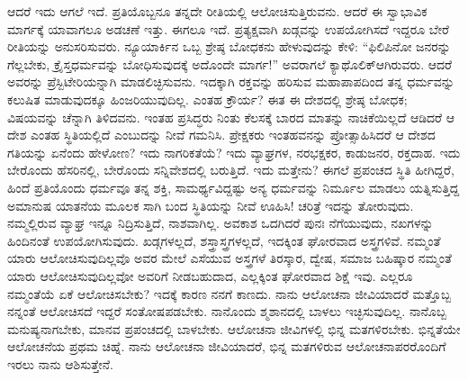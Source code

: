 
ಆದರೆ ಇದು ಆಗಲೆ ಇದೆ. ಪ್ರತಿಯೊಬ್ಬನೂ ತನ್ನದೇ ರೀತಿಯಲ್ಲಿ ಆಲೋಚಿಸುತ್ತಿರು\break ವನು. ಆದರೆ ಈ ಸ್ವಾಭಾವಿಕ ಮಾರ್ಗಕ್ಕೆ ಯಾವಾಗಲೂ ಅಡಚಣೆ ಇತ್ತು. ಈಗಲೂ ಇದೆ. ಪ್ರತ್ಯಕ್ಷವಾಗಿ ಖಡ್ಗವನ್ನು ಉಪಯೋಗಿಸದೆ ಇದ್ದರೂ ಬೇರೆ ರೀತಿಯನ್ನು ಅನುಸರಿಸುವರು. ನ್ಯೂಯಾರ್ಕಿನ ಒಬ್ಬ ಶ್ರೇಷ್ಠ ಬೋಧಕನು ಹೇಳುವುದನ್ನು ಕೇಳಿ: “ಫಿಲಿಪಿನೋ ಜನರನ್ನು ಗೆಲ್ಲಬೇಕು, ಕ್ರೈಸ್ತಧರ್ಮವನ್ನು ಬೋಧಿಸುವುದಕ್ಕೆ ಅದೊಂದೇ ಮಾರ್ಗ!” ಅವರಾಗಲೆ ಕ್ಯಾಥೊಲಿಕ್​ ಆಗಿರುವರು. ಆದರೆ ಅವರನ್ನು ಪ್ರೆಸ್ಬಿಟೇರಿಯನ್ನಾಗಿ ಮಾಡಲಿಚ್ಛಿಸುವನು. ಇದಕ್ಕಾಗಿ ರಕ್ತವನ್ನು ಹರಿಸುವ ಮಹಾಪಾಪದಿಂದ ತನ್ನ ಧರ್ಮವನ್ನು ಕಲುಷಿತ ಮಾಡುವುದಕ್ಕೂ ಹಿಂಜರಿಯುವುದಿಲ್ಲ. ಎಂತಹ ಕ್ರೌರ್ಯ? ಈತ ಈ ದೇಶದಲ್ಲಿ ಶ್ರೇಷ್ಠ ಬೋಧಕ; ವಿಷಯವನ್ನು ಚೆನ್ನಾಗಿ ತಿಳಿದವನು. ಇಂತಹ ಪ್ರಸಿದ್ಧರು ನಿಂತು ಕೆಲಸಕ್ಕೆ ಬಾರದ ಮಾತನ್ನು ನಾಚಿಕೆಯಿಲ್ಲದೆ ಆಡಿದರೆ ಆ ದೇಶ ಎಂತಹ ಸ್ಥಿತಿಯಲ್ಲಿದೆ ಎಂಬುದನ್ನು ನೀವೆ ಗಮನಿಸಿ. ಪ್ರೇಕ್ಷಕರು ಇಂತಹವನನ್ನು ಪ್ರೋತ್ಸಾಹಿಸಿದರೆ ಆ ದೇಶದ ಗತಿಯನ್ನು ಏನೆಂದು ಹೇಳೋಣ? ಇದು ನಾಗರಿಕತೆಯೆ? ಇದು ವ್ಯಾಘ್ರಗಳ, ನರಭಕ್ಷಕರ, ಕಾಡುಜನರ, ರಕ್ತದಾಹ. ಇದು ಬೇರೊಂದು ಹೆಸರಿನಲ್ಲಿ, ಬೇರೊಂದು ಸನ್ನಿವೇಶದಲ್ಲಿ ಬರುತ್ತಿದೆ. ಇದು ಮತ್ತೇನು? ಈಗಲೆ ಪ್ರಪಂಚದ ಸ್ಥಿತಿ ಹೀಗಿದ್ದರೆ, ಹಿಂದೆ ಪ್ರತಿಯೊಂದು ಧರ್ಮವೂ ತನ್ನ ಶಕ್ತಿ, ಸಾಮರ್ಥ್ಯವಿದ್ದಷ್ಟು ಅನ್ಯ ಧರ್ಮವನ್ನು ನಿರ್ಮೂಲ ಮಾಡಲು ಯತ್ನಿಸುತ್ತಿದ್ದ ಅಮಾನುಷ ಯಾತನೆಯ ಮೂಲಕ ಸಾಗಿ ಬಂದ ಸ್ಥಿತಿಯನ್ನು ನೀವೆ ಊಹಿಸಿ! ಚರಿತ್ರೆ ಇದನ್ನು ತೋರುವುದು. ನಮ್ಮಲ್ಲಿರುವ ವ್ಯಾಘ್ರ ಇನ್ನೂ ನಿದ್ರಿಸುತ್ತಿದೆ, ನಾಶವಾಗಿಲ್ಲ. ಅವಕಾಶ ಒದಗಿದರೆ ಪುನಃ ನೆಗೆಯುವುದು, ನಖಗಳನ್ನು ಹಿಂದಿನಂತೆ ಉಪಯೋಗಿಸುವುದು. ಖಡ್ಗಗಳಲ್ಲದೆ, ಶಸ್ತ್ರಾಸ್ತ್ರಗಳಲ್ಲದೆ, ಇದಕ್ಕಿಂತ ಘೋರವಾದ ಅಸ್ತ್ರಗಳಿವೆ. ನಮ್ಮಂತೆ ಯಾರು ಆಲೋಚಿಸುವುದಿಲ್ಲವೊ ಅವರ ಮೇಲೆ ಎಸೆಯುವ ಅಸ್ತ್ರಗಳೆ ತಿರಸ್ಕಾರ, ದ್ವೇಷ, ಸಮಾಜ ಬಹಿಷ್ಕಾರ ನಮ್ಮಂತೆ ಯಾರು ಆಲೋಚಿಸುವುದಿಲ್ಲವೋ ಅವರಿಗೆ ನೀಡಬಹುದಾದ, ಎಲ್ಲಕ್ಕಿಂತ ಘೋರವಾದ ಶಿಕ್ಷೆ ಇವು. ಎಲ್ಲರೂ ನಮ್ಮಂತೆಯೆ ಏಕೆ ಆಲೋಚಿಸಬೇಕು? ಇದಕ್ಕೆ ಕಾರಣ ನನಗೆ ಕಾಣದು. ನಾನು ಆಲೋಚನಾ ಜೀವಿಯಾದರೆ ಮತ್ತೊಬ್ಬ ನನ್ನಂತೆ ಆಲೋಚಿಸದೆ ಇದ್ದರೆ ಸಂತೋಷಪಡಬೇಕು. ನಾನೊಂದು ಶ್ಮಶಾನದಲ್ಲಿ ಬಾಳಲು ಇಚ್ಛಿಸುವುದಿಲ್ಲ. ನಾನೊಬ್ಬ ಮನುಷ್ಯನಾಗಬೇಕು, ಮಾನವ ಪ್ರಪಂಚದಲ್ಲಿ ಬಾಳಬೇಕು. ಆಲೋಚನಾ ಜೀವಿಗಳಲ್ಲಿ ಭಿನ್ನ ಮತಗಳಿರಬೇಕು. ಭಿನ್ನತೆಯೇ ಆಲೋಚನೆಯ ಪ್ರಥಮ ಚಿಹ್ನೆ. ನಾನು ಆಲೋಚನಾ ಜೀವಿಯಾದರೆ, ಭಿನ್ನ ಮತಗಳಿರುವ ಆಲೋಚನಾಪರರೊಂದಿಗೆ ಇರಲು ನಾನು ಆಶಿಸುತ್ತೇನೆ.


